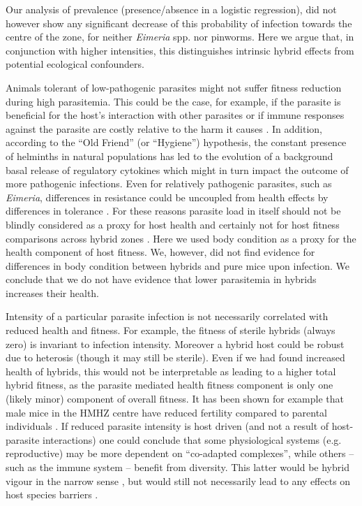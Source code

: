 \par Our analysis of prevalence (presence/absence in a logistic regression), did not however show any significant decrease of this probability of infection towards the centre of the zone, for neither \textit{Eimeria} spp. nor pinworms. Here we argue that, in conjunction with higher intensities, this distinguishes intrinsic hybrid effects from potential ecological confounders. 
\par Animals tolerant of low-pathogenic parasites might not suffer fitness reduction during high parasitemia. This could be the case, for example, if the parasite is beneficial for the host’s interaction with other parasites \citep{heitlinger_intestinal_2017} or if immune responses against the parasite are costly relative to the harm it causes \citep{raaberg_disentangling_2007}. In addition, according to the “Old Friend” (or “Hygiene”) hypothesis, the constant presence of helminths in natural populations has led to the evolution of a background basal release of regulatory cytokines \citep{rook_review_2009} which might in turn impact the outcome of more pathogenic infections. Even for relatively pathogenic parasites, such as \textit{Eimeria}, differences in resistance could be uncoupled from health effects by differences in tolerance \citep{raaberg_disentangling_2007}. For these reasons parasite load in itself should not be blindly considered as a proxy for host health and certainly not for host fitness comparisons across hybrid zones \parencite[see][]{baird_shifting_2019}. Here we used body condition as a proxy for the health component of host fitness. We, however, did not find evidence for differences in body condition between hybrids and pure mice upon infection. We conclude that we do not have evidence that lower parasitemia in hybrids increases their health. 
\par Intensity of a particular parasite infection is not necessarily correlated with reduced health and  fitness. For example, the fitness of sterile hybrids (always zero) is invariant to infection intensity. Moreover a hybrid host could be robust due to heterosis (though it may still be sterile). Even if we had found increased health of hybrids, this would not be interpretable as leading to a higher total hybrid fitness, as the parasite mediated health fitness component is only one (likely minor) component of overall fitness. It has been shown for example that male mice in the HMHZ centre have reduced fertility compared to parental individuals \citep{albrechtova_sperm-related_2012, turner_reduced_2012}. If reduced parasite intensity is host driven (and not a result of host-parasite interactions) one could conclude that some physiological systems (e.g. reproductive) may be more dependent on “co-adapted complexes”, while others – such as the immune system – benefit from diversity. This latter would be hybrid vigour in the narrow sense \citep{baird_where_2012}, but would still not necessarily lead to any effects on host species barriers \citep{baird_shifting_2019}. 
